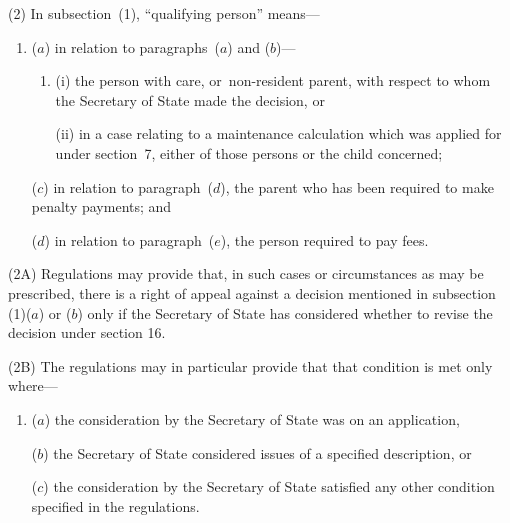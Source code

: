 \documentclass[12pt,a4paper]{article}
\begin{document}
(2) In subsection~(1), “qualifying person” means—
\begin{enumerate}\item[]
($a$) in relation to paragraphs~($a$)  and ($b$)—
\begin{enumerate}\item[]
(i) the person with care, or~non-resident parent, with respect to whom the 
Secretary of State  %
made the decision, or

(ii) in a case relating to a maintenance calculation which was applied for under section~7, either of those persons or the child concerned;
\end{enumerate}


($c$) in relation to paragraph~($d$), the parent who has been required to make penalty payments; and

($d$) in relation to paragraph~($e$), the person required to pay fees.
\end{enumerate}

(2A) Regulations may provide that, in such cases or circumstances as may be prescribed, there is a right of appeal against a decision mentioned in subsection (1)($a$) or ($b$) only if the 
Secretary of State  %
has considered whether to revise the decision under section 16.

(2B) The regulations may in particular provide that that condition is met only where—
\begin{enumerate}\item[]
($a$) the consideration by the 
Secretary of State  %
was on an application,

($b$) the 
Secretary of State  %
considered issues of a specified description, or

($c$) the consideration by the 
Secretary of State  %
satisfied any other condition specified in the regulations.
\end{enumerate}
\end{document}

